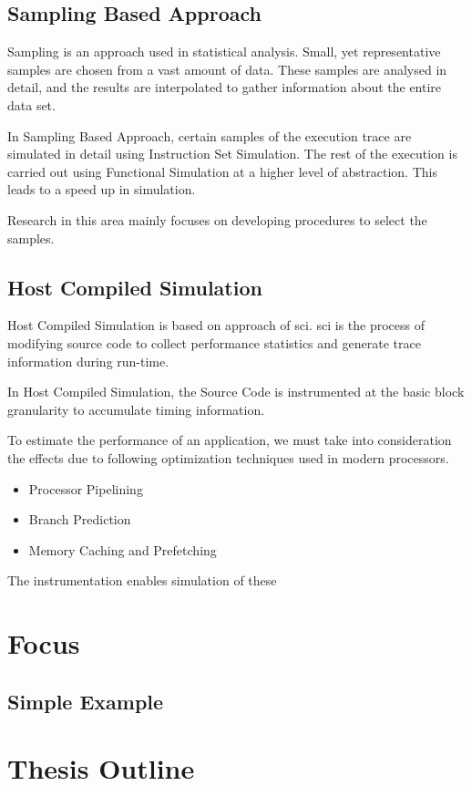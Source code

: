 \subsection{Sampling Based Approach}
Sampling is an approach used in statistical analysis. Small, yet representative samples are chosen from a vast amount of data. These samples are analysed in detail, and the results are interpolated to gather information about the entire data set.

In Sampling Based Approach, certain samples of the execution trace are simulated in detail using Instruction Set Simulation. The rest of the execution is carried out using Functional Simulation at a higher level of abstraction. This leads to a speed up in simulation.

Research in this area mainly focuses on developing procedures to select the samples.


\subsection{Host Compiled Simulation}
Host Compiled Simulation is based on approach of \gls{sci}. \gls{sci} is the process of modifying source code to collect performance statistics and generate trace information during run-time. 

In Host Compiled Simulation, the Source Code is instrumented at the basic block granularity to accumulate timing information.

To estimate the performance of an application, we must take into consideration the effects due to following optimization techniques used in modern processors.
\begin{itemize} \itemsep -8pt
\item Processor Pipelining
\item Branch Prediction
\item Memory Caching and Prefetching
\end{itemize}
The instrumentation enables simulation of these

\section{Focus}

\subsection{Simple Example}

\section{Thesis Outline}